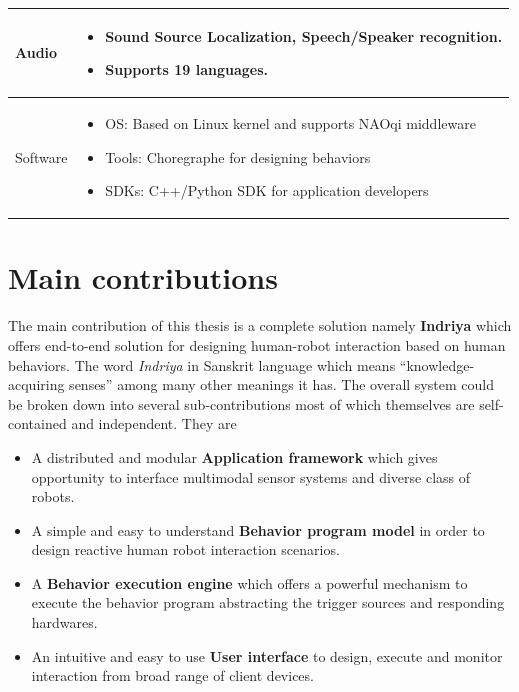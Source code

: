 \begin{table}[H]
\begin{tabular}{ | l | p{12cm} |}
  Audio & \begin{itemize}[leftmargin=*,topsep={0pt},itemsep={0pt},partopsep={0pt},parsep={0pt}] \item Sound Source Localization, Speech/Speaker recognition. \item Supports 19 languages.\end{itemize} \\
                                          \hline
  Software & \begin{itemize}[leftmargin=*,topsep={0pt},itemsep={0pt},partopsep={0pt},parsep={0pt}] \item OS: Based on Linux kernel and supports NAOqi middleware
  							\item Tools: Choregraphe \cite{pot2009choregraphe} for designing behaviors
  							\item SDKs: C++/Python SDK for application developers \end{itemize} \\
                                          \hline
    \end{tabular}
\end{table}

\section{Main contributions}
\label{sec:contributions}

The main contribution of this thesis is a complete solution namely \textbf{Indriya} which offers end-to-end solution for designing human-robot interaction based on human behaviors. The word \emph{Indriya} in Sanskrit language which means ``knowledge-acquiring senses'' among many other meanings it has. The overall system could be broken down into several sub-contributions most of which themselves are self-contained and independent. They are
\begin{itemize}
\item A distributed and modular \textbf{Application framework} which gives opportunity to interface multimodal sensor systems and diverse class of robots.
\item A simple and easy to understand \textbf{Behavior program model} in order to design reactive human robot interaction scenarios.
\item A \textbf{Behavior execution engine} which offers a powerful mechanism to execute the behavior program abstracting the trigger sources and responding hardwares.
\item An intuitive and easy to use \textbf{User interface} to design, execute and monitor interaction from broad range of client devices.
\end{itemize}

